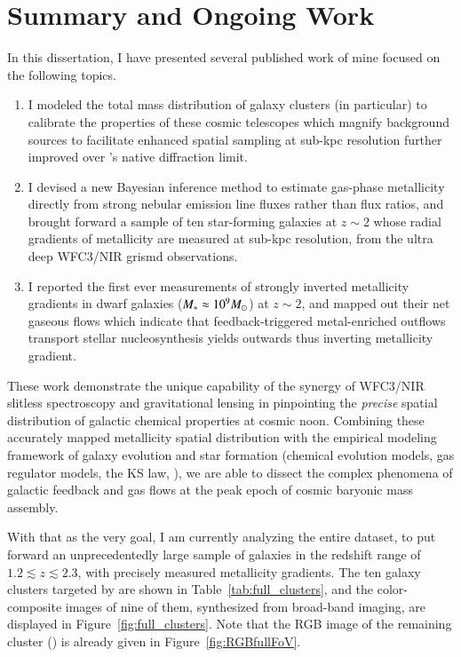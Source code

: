 
\chapter{Summary and Ongoing Work}

In this dissertation, I have presented several published work of mine focused on the following topics.

\begin{enumerate}
    \item I modeled the total mass distribution of galaxy clusters (\cler in particular) to calibrate the
    properties of these cosmic telescopes which magnify background sources to facilitate enhanced spatial
    sampling at sub-kpc resolution further improved over \hst's native diffraction limit.
    \item I devised a new Bayesian inference method to estimate gas-phase metallicity directly from strong
    nebular emission line fluxes rather than flux ratios, and brought forward a sample of ten star-forming
    galaxies at $z\sim2$ whose radial gradients of metallicity are measured at sub-kpc resolution, from the
    ultra deep \hst WFC3/NIR grismd observations.
    \item I reported the first ever measurements of strongly inverted metallicity gradients in dwarf galaxies
    ($M_\ast\approx10^9M_\odot$) at $z\sim2$, and mapped out their net gaseous flows which indicate that
    feedback-triggered metal-enriched outflows transport stellar nucleosynthesis yields outwards thus
    inverting metallicity gradient.
\end{enumerate}

These work demonstrate the unique capability of the synergy of \hst WFC3/NIR slitless spectroscopy and
gravitational lensing in pinpointing the \emph{precise} spatial distribution of galactic chemical properties at
cosmic noon.  Combining these accurately mapped metallicity spatial distribution with the empirical modeling
framework of galaxy evolution and star formation (\eg chemical evolution models, gas regulator models, the KS
law, \etc), we are able to dissect the complex phenomena of galactic feedback and gas flows at the peak epoch of
cosmic baryonic mass assembly.

With that as the very goal, I am currently analyzing the entire \glass dataset, to put forward an unprecedentedly
large sample of galaxies in the redshift range of $1.2\lesssim z\lesssim2.3$, with precisely measured metallicity
gradients. The ten galaxy clusters targeted by \glass are shown in Table~\ref{tab:full_clusters}, and the
color-composite images of nine of them, synthesized from \hst broad-band imaging, are displayed in
Figure~\ref{fig:full_clusters}. Note that the RGB image of the remaining cluster (\ie \clyi) is already given in
Figure~\ref{fig:RGBfullFoV}.


